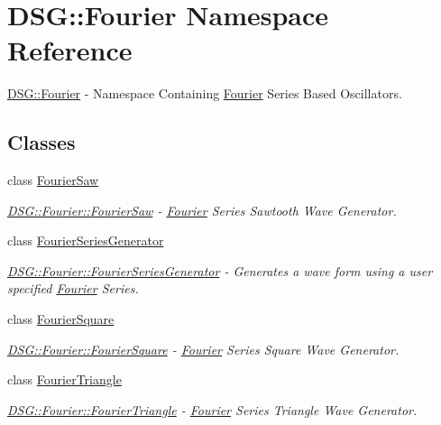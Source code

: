 \hypertarget{namespace_d_s_g_1_1_fourier}{\section{D\+S\+G\+:\+:Fourier Namespace Reference}
\label{namespace_d_s_g_1_1_fourier}
}


\hyperlink{namespace_d_s_g_1_1_fourier}{D\+S\+G\+::\+Fourier} -\/ Namespace Containing \hyperlink{namespace_d_s_g_1_1_fourier}{Fourier} Series Based Oscillators.  


\subsection*{Classes}
\begin{DoxyCompactItemize}
\item 
class \hyperlink{class_d_s_g_1_1_fourier_1_1_fourier_saw}{Fourier\+Saw}
\begin{DoxyCompactList}\small\item\em \hyperlink{class_d_s_g_1_1_fourier_1_1_fourier_saw}{D\+S\+G\+::\+Fourier\+::\+Fourier\+Saw} -\/ \hyperlink{namespace_d_s_g_1_1_fourier}{Fourier} Series Sawtooth Wave Generator. \end{DoxyCompactList}\item 
class \hyperlink{class_d_s_g_1_1_fourier_1_1_fourier_series_generator}{Fourier\+Series\+Generator}
\begin{DoxyCompactList}\small\item\em \hyperlink{class_d_s_g_1_1_fourier_1_1_fourier_series_generator}{D\+S\+G\+::\+Fourier\+::\+Fourier\+Series\+Generator} -\/ Generates a wave form using a user specified \hyperlink{namespace_d_s_g_1_1_fourier}{Fourier} Series. \end{DoxyCompactList}\item 
class \hyperlink{class_d_s_g_1_1_fourier_1_1_fourier_square}{Fourier\+Square}
\begin{DoxyCompactList}\small\item\em \hyperlink{class_d_s_g_1_1_fourier_1_1_fourier_square}{D\+S\+G\+::\+Fourier\+::\+Fourier\+Square} -\/ \hyperlink{namespace_d_s_g_1_1_fourier}{Fourier} Series Square Wave Generator. \end{DoxyCompactList}\item 
class \hyperlink{class_d_s_g_1_1_fourier_1_1_fourier_triangle}{Fourier\+Triangle}
\begin{DoxyCompactList}\small\item\em \hyperlink{class_d_s_g_1_1_fourier_1_1_fourier_triangle}{D\+S\+G\+::\+Fourier\+::\+Fourier\+Triangle} -\/ \hyperlink{namespace_d_s_g_1_1_fourier}{Fourier} Series Triangle Wave Generator. \end{DoxyCompactList}\item 

\end{DoxyCompactItemize}
